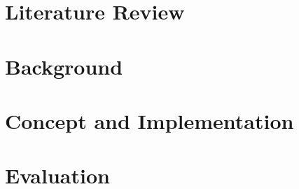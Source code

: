 \documentclass[draft,final]{vutinfth} %
\begin{document}
    \chapter{Literature Review}\label{ch:literature-review}
    
    
    
    
    
    
    
    
    
    \clearpage
    

    \chapter{Background}\label{ch:background}
    
    \clearpage
    
    
    
    

    \chapter{Concept and Implementation}\label{ch:implementation}
    
    
    
    
    
    
    
    
    
    

    \chapter{Evaluation}\label{ch:evaluation}
    
\end{document}
